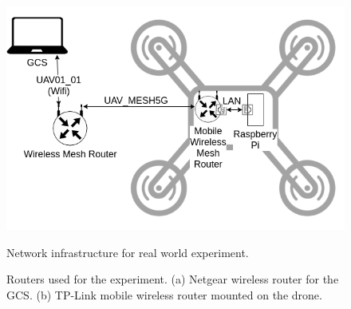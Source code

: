 \begin{figure}
	\centering
	\caption[Network infrastructure for real world experiment.]{\small Network infrastructure for real world experiment.} 
	\includegraphics[width=5in]{figures/experiment/real-world-network}
	\label{fig:mesh-network-real-world}
\end{figure}

\begin{figure}
	\centering
	\caption[Wireless routers used in experiment.]{\small 
		Routers used for the experiment. (a) Netgear wireless router for the GCS. (b) TP-Link mobile wireless router mounted on the drone. }
	
	\label{fig:real-routers}
\end{figure}


